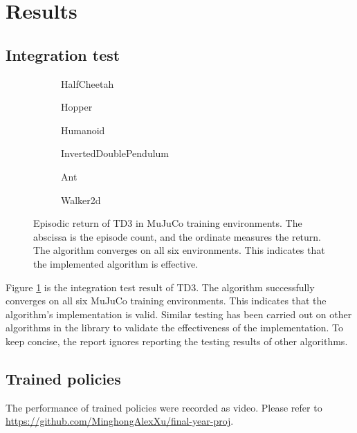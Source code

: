 \newpage
\section{Results} \label{sec:results}

\subsection{Integration test}

\begin{figure}[htbp]
\centering
\begin{subfigure}[b]{0.49\textwidth}
   \centering
   
   \caption{HalfCheetah}
\end{subfigure}
\begin{subfigure}[b]{0.49\textwidth}
   \centering
   
   \caption{Hopper}
\end{subfigure}
\begin{subfigure}[b]{0.49\textwidth}
   \centering
   
   \caption{Humanoid}
\end{subfigure}
\begin{subfigure}[b]{0.49\textwidth}
   \centering
   
   \caption{InvertedDoublePendulum}
\end{subfigure}
\begin{subfigure}[b]{0.49\textwidth}
   \centering
   
   \caption{Ant}
\end{subfigure}
\begin{subfigure}[b]{0.49\textwidth}
   \centering
   
   \caption{Walker2d}
\end{subfigure}
\caption{Episodic return of TD3 in MuJuCo training environments. The abscissa is the episode count, and the ordinate measures the return. The algorithm converges on all six environments. This indicates that the implemented algorithm is effective.}
\label{fig:td3_test}
\end{figure}

Figure \ref{fig:td3_test} is the integration test result of TD3. The algorithm successfully converges on all six MuJuCo training environments. This indicates that the algorithm's implementation is valid. Similar testing has been carried out on other algorithms in the library to validate the effectiveness of the implementation. To keep concise, the report ignores reporting the testing results of other algorithms.

\subsection{Trained policies}

The performance of trained policies were recorded as video. Please refer to \url{https://github.com/MinghongAlexXu/final-year-proj}.
